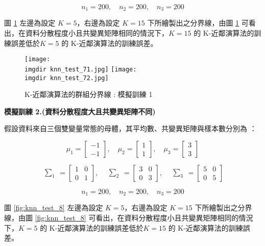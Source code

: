 \[n_1 = 200, \quad n_2 = 200, \quad n_3 = 200\]

圖 \ref{fig:knn_test_7} 左邊為設定 $K =5$，右邊為設定 $K = 15$ 下所繪製出之分界線，由圖 \ref{fig:knn_test_7} 可看出，在資料分散程度小且共變異矩陣相同的情況下，$K = 15$ 的 K-近鄰演算法的訓練誤差低於$K = 5$ 的 K-近鄰演算法的訓練誤差。

\begin{figure}[H]
\centering
\texttt{[image: \\imgdir knn\_test\_71.jpg]}
\texttt{[image: \\imgdir knn\_test\_72.jpg]}
\caption{K-近鄰演算法的群組分界線 : 模擬訓練 1} 
\label{fig:knn_test_7}
\end{figure}

\textbf{\large 模擬訓練 2.(資料分散程度大且共變異矩陣不同)}

假設資料來自三個雙變量常態的母體，其平均數、共變異矩陣與樣本數分別為 ：

\[\mu_1 = \begin{bmatrix}
-1 \\
-1
\end{bmatrix}, \quad \mu_2 = \begin{bmatrix}
1 \\
1
\end{bmatrix}, \quad \mu_3 = \begin{bmatrix}
3 \\
3
\end{bmatrix}\]

\[\begin{matrix} \sum_{1} \end{matrix} = \begin{bmatrix}
1 & 0\\
0 & 1
\end{bmatrix}, \quad \begin{matrix} \sum_{2} \end{matrix} = \begin{bmatrix}
3 & 0\\
0 & 3
\end{bmatrix}, \quad \begin{matrix} \sum_{3} \end{matrix} = \begin{bmatrix}
5 & 0\\
0 & 5
\end{bmatrix}\]

\[n_1 = 200, \quad n_2 = 200, \quad n_3 = 200\]

圖 \ref{fig:knn_test_8} 左邊為設定 $K =5$，右邊為設定 $K = 15$ 下所繪製出之分界線，由圖 \ref{fig:knn_test_8} 可看出，在資料分散程度小且共變異矩陣相同的情況下，$K = 5$ 的 K-近鄰演算法的訓練誤差低於$K = 15$ 的 K-近鄰演算法的訓練誤差。

